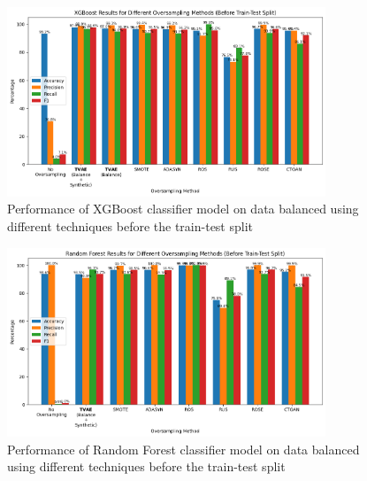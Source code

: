 \documentclass[twoside,11pt]{article}
\begin{document}
\begin{figure}
  \centering
  \includegraphics[width=0.85\textwidth]{images/xgboost_oversample_before_split.png}
  \caption{Performance of XGBoost classifier model on data balanced using different techniques before the train-test split}
  \label{fig:xgboost_oversample_before_split}
\end{figure}

\begin{figure}
  \centering
  \includegraphics[width=0.85\textwidth]{images/rf_oversample_before_slit.png}
  \caption{Performance of Random Forest classifier model on data balanced using different techniques before the train-test split}
  \label{fig:rf_oversample_before_split}
\end{figure}
\end{document}

